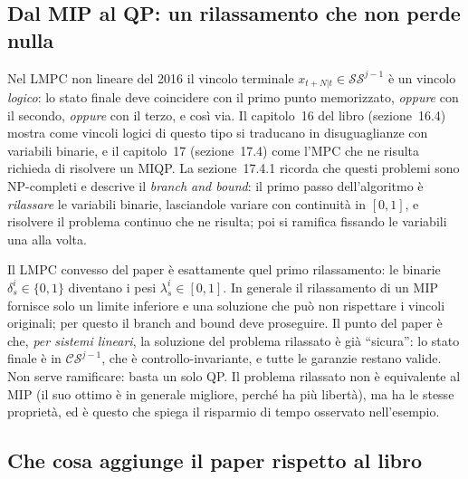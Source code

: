 \documentclass[11pt,a4paper]{article}
\theoremstyle{definition}
\theoremstyle{plain}
\theoremstyle{remark}
\newcommand{\SSet}{\mathcal{SS}}
\newcommand{\CS}{\mathcal{CS}}
\begin{document}
\subsection{Dal MIP al QP: un rilassamento che non perde nulla}\label{sec:libro-mip}

Nel LMPC non lineare del 2016 il vincolo terminale $x_{t+N|t}\in\SSet^{j-1}$
è un vincolo \emph{logico}: lo stato finale deve coincidere con il primo punto
memorizzato, \emph{oppure} con il secondo, \emph{oppure} con il terzo, e così
via. Il capitolo~16 del libro (sezione~16.4) mostra come vincoli logici di
questo tipo si traducano in disuguaglianze con variabili binarie, e il
capitolo~17 (sezione~17.4) come l'MPC che ne risulta richieda di risolvere un
MIQP. La sezione~17.4.1 ricorda che questi problemi sono NP-completi e
descrive il \emph{branch and bound}: il primo passo dell'algoritmo è
\emph{rilassare} le variabili binarie, lasciandole variare con continuità in
$[0,1]$, e risolvere il problema continuo che ne risulta; poi si ramifica
fissando le variabili una alla volta.

Il LMPC convesso del paper è esattamente quel primo rilassamento: le binarie
$\delta^i_s\in\{0,1\}$ diventano i pesi $\lambda^i_s\in[0,1]$. In generale il
rilassamento di un MIP fornisce solo un limite inferiore e una soluzione che
può non rispettare i vincoli originali; per questo il branch and bound deve
proseguire. Il punto del paper è che, \emph{per sistemi lineari}, la soluzione
del problema rilassato è già ``sicura'': lo stato finale è in $\CS^{j-1}$, che
è controllo-invariante, e tutte le garanzie restano valide. Non serve
ramificare: basta un solo QP. Il problema rilassato non è equivalente al MIP
(il suo ottimo è in generale migliore, perché ha più libertà), ma ha le stesse
proprietà, ed è questo che spiega il risparmio di tempo osservato
nell'esempio.

\subsection{Che cosa aggiunge il paper rispetto al libro}\label{sec:libro-novita}
\end{document}
